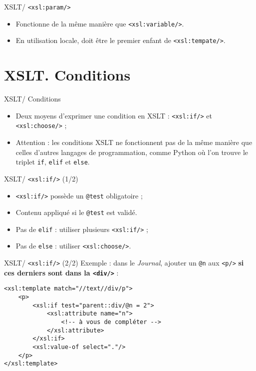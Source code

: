 \documentclass{beamer}
\begin{document}
    \begin{frame}{XSLT/ \texttt{<xsl:param/>}}
        \Large
        \begin{itemize}
            \item Fonctionne de la même manière que \texttt{<xsl:variable/>}.
            \item En utilisation locale, doit être le premier enfant de \texttt{<xsl:tempate/>}.
        \end{itemize}
    \end{frame}

    \section{XSLT. Conditions}

    \begin{frame}{XSLT/ Conditions}
        \Large
        \begin{itemize}
            \item Deux moyens d'exprimer une condition en XSLT : \texttt{<xsl:if/>} et \texttt{<xsl:choose/>} ;
            \bigskip
            \item Attention : les conditions XSLT ne fonctionnent pas de la même manière que celles d'autres langages de programmation, comme Python où l'on trouve le triplet \texttt{if}, \texttt{elif} et \texttt{else}.
        \end{itemize}
    \end{frame}

    \begin{frame}{XSLT/ \texttt{<xsl:if/>} (1/2)}
        \Large
        \begin{itemize}
            \item \texttt{<xsl:if/>} possède un \texttt{@test} obligatoire ;
            \item Contenu appliqué si le \texttt{@test} est validé.
            \bigskip
            \item Pas de \texttt{elif} : utiliser plusieurs \texttt{<xsl:if/>} ;
            \item Pas de \texttt{else} : utiliser \texttt{<xsl:choose/>}.
        \end{itemize}
    \end{frame}

    \begin{frame}[fragile]{XSLT/ \texttt{<xsl:if/>} (2/2)}
        \Large
        Exemple : dans le \textit{Journal}, ajouter un \texttt{@n} aux \texttt{<p/>} \textbf{si ces derniers sont dans la \texttt{<div/>} } :
        \normalsize
        \begin{verbatim}
<xsl:template match="//text//div/p">
    <p>
        <xsl:if test="parent::div/@n = 2">
            <xsl:attribute name="n">
                <!-- à vous de compléter -->
            </xsl:attribute>
        </xsl:if>
        <xsl:value-of select="."/>
    </p>
</xsl:template>
        \end{verbatim}
    \end{frame}
\end{document}
